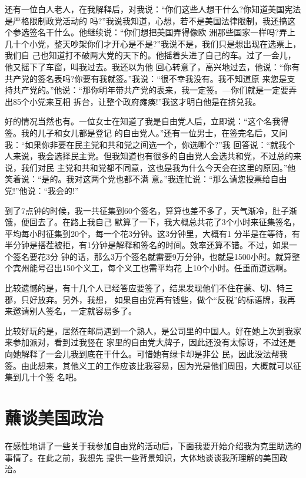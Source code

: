 ﻿\documentclass[11pt]{article}
\begin{document}
还有一位白人老人，在我解释后，对我说：``你们这些人想干什么?你知道美国宪法是严格限制政党活动的
吗?''我说我知道，心想，若不是美国法律限制，我还搞这个参选签名干什么。他继续说：``你们想把美国弄得像欧
洲那些国家一样吗?弄上几十个小党，整天吵架你们才开心是不是?''我说不是，我们只是想出现在选票上，我们自
己也知道打不破两大党的天下的。他摇着头进了自己的车。过了一会儿，他又摇下了车窗，叫我过去。我还以为他
回心转意了，高兴地过去，他说：``你有共产党的签名表吗?你要有我就签。''我说：``很不幸我没有。我不知道原
来您是支持共产党的。''他说：``那你明年带共产党的表来，我一定签。---你们就是一定要弄出85个小党来互相
拆台，让整个政府瘫痪!''我这才明白他是在挤兑我。

好的情况当然也有。一位女士在知道了我是自由党人后，立即说：``这个名我得签。我的儿子和女儿都是登记
的自由党人。''还有一位男士，在签完名后，又问我：``如果你非要在民主党和共和党之间选一个，你选哪个?''我
回答说：``就我个人来说，我会选择民主党。但我知道也有很多的自由党人会选共和党，不过总的来说，我们对民
主党和共和党都不同意，这也是我为什么今天会在这里的原因。''他笑着说：``是的。我对这两个党也都不满
意。''我连忙说：``那么请您投票给自由党!''他说：``我会的!''

到了7点钟的时候，我一共征集到60个签名，算算也差不多了，天气渐冷，肚子渐饿，便回去了。在路上我自己
默算了一下，我大概总共花了3个小时来征集签名，平均每小时征集到20个，每一个花3分钟。这3分钟里，大概有1
分半是在等待，有半分钟是搭茬被拒，有1分钟是解释和签名的时间。效率还算不错。不过，如果一个签名要花3分
钟的话，那么3万个签名就需要9万分钟，也就是1500小时。就算整个宾州能号召出150个义工，每个义工也需平均花
上10个小时。任重而道远啊。

比较遗憾的是，有十几个人已经答应要签了，结果发现他们不住在蒙、切、特三郡，只好放弃。另外，我想，
如果自由党再有钱些，做个``反税''的标语牌，我再来邀请别人签名，一定就容易多了。

比较好玩的是，居然在邮局遇到一个熟人，是公司里的中国人。好在她上次到我家来参加派对，看到过我竖在
家里的自由党大牌子，因此还没有太惊讶，不过还是向她解释了一会儿我到底在干什么。可惜她有绿卡却是非公
民，因此没法帮我签。由此想来，其他义工的工作应该比我容易，因为光是他们周围，大概就可以征集到几十个签
名吧。

\section{蘸谈美国政治}

在感性地讲了一些关于我参加自由党的活动后，下面我要开始介绍我为克里助选的事情了。在此之前，我想先
提供一些背景知识，大体地谈谈我所理解的美国政治。
\end{document}
